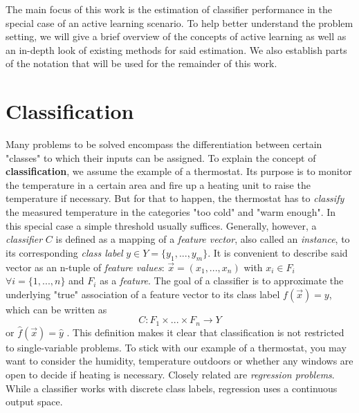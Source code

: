 \label{background}


The main focus of this work is the estimation of classifier performance in the special case of an active learning scenario. To help better understand the problem setting, we will give a brief overview of the concepts of active learning as well as an in-depth look of existing methods for said estimation. We also establish parts of the notation that will be used for the remainder of this work.

\section{Classification}
Many problems to be solved encompass the differentiation between certain "classes" to which their inputs can be assigned. To explain the concept of \textbf{classification}, we assume the example of a thermostat. Its purpose is to monitor the temperature in a certain area and fire up a heating unit to raise the temperature if necessary. But for that to happen, the thermostat has to \textit{classify} the measured temperature in the categories "too cold" and "warm enough". In this special case a simple threshold usually suffices. Generally, however, a \textit{classifier} $C$ is defined as a mapping of a \textit{feature vector}, also called an \textit{instance}, to its corresponding \textit{class label} $y \in Y = \{y_1, ..., y_m\}$. It is convenient to describe said vector as an n-tuple of \textit{feature values}: $\vec{x} = (x_1, ..., x_n)$ with $x_i \in F_i$ $\forall i=\{1,...,n\}$ and $F_i$ as a \textit{feature}. The goal of a classifier is to approximate the underlying "true" association of a feature vector to its class label $f(\vec{x}) = y$, which can be written as
\begin{equation}
C: F_1 \times ... \times F_n \rightarrow Y
\end{equation}
or $\hat{f}(\vec{x}) = \hat{y}$ \cite{RodriguezEtAl2013}. This definition makes it clear that classification is not restricted to single-variable problems. To stick with our example of a thermostat, you may want to consider the humidity, temperature outdoors or whether any windows are open to decide if heating is necessary. Closely related are \textit{regression problems}. While a classifier works with discrete class labels, regression uses a continuous output space.

